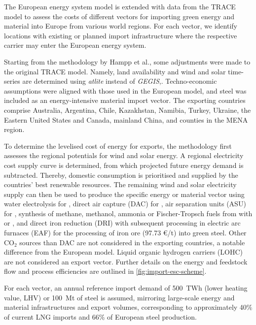 The European energy system model is extended with data from the TRACE model
\cite{hamppImportOptions2023} to assess the costs of different vectors for
importing green energy and material into Europe from various world regions. For
each vector, we identify locations with existing or planned import
infrastructure where the respective carrier may enter the European energy
system.

Starting from the methodology by Hampp et al.\cite{hamppImportOptions2023}, some
adjustments were made to the original TRACE model. Namely, land availability and
wind and solar time-series are determined using
\textit{atlite}\cite{hofmannAtliteLightweight2021} instead of
\textit{GEGIS},\cite{mattssonAutopilotEnergy2021}. Techno-economic assumptions
were aligned with those used in the European model, and steel was included as an
energy-intensive material import vector. The exporting countries comprise
Australia, Argentina, Chile, Kazakhstan, Namibia, Turkey, Ukraine, the Eastern
United States and Canada, mainland China, and counties in the MENA region.

To determine the levelised cost of energy for exports, the methodology first
assesses the regional potentials for wind and solar energy. A regional
electricity cost supply curve is determined, from which projected future energy
demand is subtracted. Thereby, domestic consumption is prioritised and supplied
by the countries' best renewable resources. The remaining wind and solar
electricity supply can then be used to produce the specific energy or material
vector using water electrolysis for , direct air capture (DAC) for
, air separation units (ASU) for , synthesis of methane,
methanol, ammonia or Fischer-Tropsch fuels from  with  or
, and  direct iron reduction (DRI) with subsequent processing in
electric arc furnaces (EAF) for the processing of iron ore (97.73 \euro{}/t)
into green steel. Other CO$_2$ sources than DAC are not considered in the
exporting countries, a notable difference from the European model. Liquid
organic hydrogen carriers (LOHC) are not considered an export vector. Further
details on the energy and feedstock flow and process efficiencies are outlined
in \cref{fig:import-esc-scheme}.

For each vector, an annual reference import demand of 500~TWh (lower heating
value, LHV) or 100~Mt of steel is assumed, mirroring large-scale energy and
material infrastructures and export volumes, corresponding to approximately 40\%
of current LNG
imports\cite{instituteforenergyeconomicsandfinancialanalysisEuropeanLNG2023} and
66\% of European steel
production.\cite{eurofer-theeuropeansteelassociationEuropeanSteel2023}

